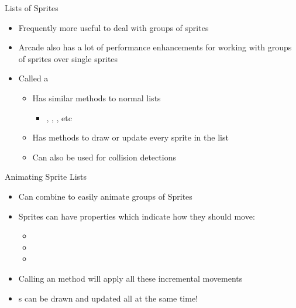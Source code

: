 \documentclass[pdf, aspectratio=169, 12pt]{beamer}
\begin{document}
\begin{frame}{Lists of Sprites}
	\begin{itemize}
		\item Frequently more useful to deal with groups of sprites
		\item Arcade also has a lot of performance enhancements for working with groups of sprites over single sprites
		\item Called a 
			\begin{itemize}
				\item Has similar methods to normal lists
					\begin{itemize}
						\item {}, , , etc
					\end{itemize}
				\item Has methods to draw or update every sprite in the list
				\item Can also be used for collision detections
			\end{itemize}
	\end{itemize}
\end{frame}

\begin{frame}{Animating Sprite Lists}
	\begin{itemize}
		\item Can combine to easily animate groups of Sprites
		\item Sprites can have properties which indicate how they should move:
			\begin{itemize}
				\item {}
				\item {}
				\item {}
			\end{itemize}
		\item Calling an  method will apply all these incremental movements
		\item {}s can be drawn and updated all at the same time!
	\end{itemize}
\end{frame}
\end{document}
